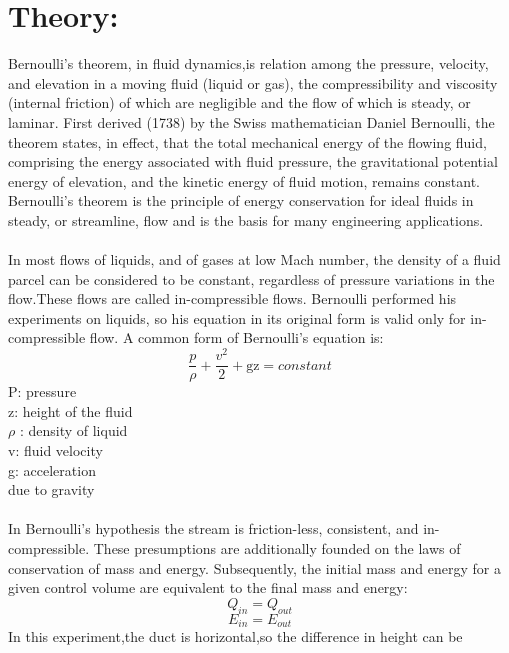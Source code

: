 \documentclass[12pt,a4paper]{article}
\begin{document}
\section{Theory:}
Bernoulli’s theorem, in fluid dynamics,is relation among the pressure, velocity, and elevation in a moving fluid (liquid or gas), the compressibility and viscosity (internal friction) of which are negligible and the flow of which is steady, or laminar. First derived (1738) by the Swiss mathematician Daniel Bernoulli, the theorem states, in effect, that the total mechanical energy of the flowing fluid, comprising the energy associated with fluid pressure, the gravitational potential energy of elevation, and the kinetic energy of fluid motion, remains constant. Bernoulli’s theorem is the principle of energy conservation for ideal fluids in steady, or streamline, flow and is the basis for many engineering applications.\\
\\In most flows of liquids, and of gases at low Mach number, the density of a fluid parcel can be considered to be constant, regardless of pressure variations in the flow.These flows are called in-compressible flows. Bernoulli performed his experiments on liquids, so his equation in its original form is valid only for in-compressible flow. A common form of Bernoulli’s equation is:\\
\begin{equation}
\frac{p}{\rho} + \frac{v^2}{2} + \text{gz} = constant
\end{equation}
P: pressure\\
z: height of the fluid\\
$\rho$ : density of liquid\\
v: fluid velocity\\
g: acceleration\\
due to gravity\\
\\In Bernoulli’s hypothesis the stream is friction-less, consistent, and in-compressible. These presumptions are additionally founded on the laws of conservation of mass and energy. Subsequently, the initial mass and energy for a given control volume are equivalent to the final mass and energy:\\
\begin{equation}
Q_{in} = Q_{out}
\end{equation}
\begin{equation}
E_{in} = E_{out}
\end{equation}
In this experiment,the duct is horizontal,so the difference in height can be
\end{document}
